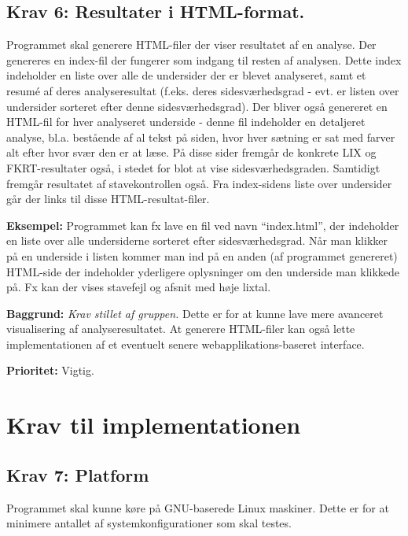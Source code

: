 \documentclass[a4paper,oneside,article, titlepage]{article}
\begin{document}
\subsection{Krav 6: Resultater i HTML-format.}
Programmet skal generere HTML-filer der viser resultatet af en
analyse. Der genereres en index-fil der fungerer som indgang til
resten af analysen. Dette index indeholder en liste over alle de
undersider der er blevet analyseret, samt et resumé af deres
analyseresultat (f.eks. deres sidesværhedsgrad - evt. er listen over
undersider sorteret efter denne sidesværhedsgrad). Der bliver også
genereret en HTML-fil for hver analyseret underside - denne fil
indeholder en detaljeret analyse, bl.a. bestående af al tekst på
siden, hvor hver sætning er sat med farver alt efter hvor svær den er
at læse. På disse sider fremgår de konkrete LIX og FKRT-resultater
også, i stedet for blot at vise sidesværhedsgraden. Samtidigt fremgår
resultatet af stavekontrollen også. Fra index-sidens liste over
undersider går der links til disse HTML-resultat-filer.

\begin{description}
\item \textbf{Eksempel:} Programmet kan fx lave en fil ved navn
  ``index.html'', der indeholder en liste over alle undersiderne
  sorteret efter sidesværhedsgrad. Når man klikker på en underside i
  listen kommer man ind på en anden (af programmet genereret)
  HTML-side der indeholder yderligere oplysninger om den underside man
  klikkede på. Fx kan der vises stavefejl og afsnit med høje lixtal.

\item \textbf{Baggrund:} \textit{Krav stillet af gruppen.}  Dette er
  for at kunne lave mere avanceret visualisering af
  analyseresultatet. At generere HTML-filer kan også lette
  implementationen af et eventuelt senere web\-appli\-kations-baseret
  interface.
\item \textbf{Prioritet:} Vigtig.
\end{description}


\section{Krav til implementationen}

\subsection{Krav 7: Platform}
Programmet skal kunne køre på GNU-baserede Linux maskiner. Dette er
for at minimere antallet af systemkonfigurationer som skal testes.
\end{document}
